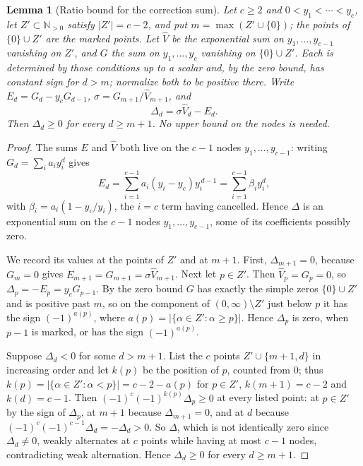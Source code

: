 \documentclass[11pt]{article}
\newtheorem{lemma}[theorem]{Lemma}
\newcommand{\N}{\mathbb N}
\begin{document}
\begin{lemma}[Ratio bound for the correction sum]\label{lem:interlace}
Let $c\ge2$ and $0<y_1<\cdots<y_c$, let $Z'\subset\N_{>0}$ satisfy $|Z'|=c-2$, and put
$m=\max(Z'\cup\{0\})$; the points of $\{0\}\cup Z'$ are the marked
points.  Let $\widehat V$ be the exponential sum on
$y_1,\ldots,y_{c-1}$ vanishing on $Z'$, and $G$ the sum on
$y_1,\ldots,y_c$ vanishing on $\{0\}\cup Z'$.  Each is determined by those
conditions up to a scalar and, by the zero bound, has constant sign for
$d>m$; normalize both to be positive there.  Write $E_d=G_d-y_cG_{d-1}$,
$\sigma=G_{m+1}/\widehat V_{m+1}$, and
\[
  \Delta_d=\sigma\widehat V_d-E_d.
\]
Then $\Delta_d\ge0$ for every $d\ge m+1$.  No upper bound on the nodes is
needed.
\end{lemma}

\begin{proof}
The sums $E$ and $\widehat V$ both live on the $c-1$ nodes
$y_1,\ldots,y_{c-1}$: writing $G_d=\sum_ia_iy_i^d$ gives
\[
  E_d=\sum_{i=1}^{c-1}a_i(y_i-y_c)y_i^{\,d-1}
      =\sum_{i=1}^{c-1}\beta_iy_i^d,
\]
with $\beta_i=a_i(1-y_c/y_i)$, the $i=c$ term having cancelled.  Hence $\Delta$
is an exponential sum on the $c-1$ nodes $y_1,\ldots,y_{c-1}$, some of its
coefficients possibly zero.

We record its values at the points of $Z'$ and at $m+1$.  First,
$\Delta_{m+1}=0$, because $G_m=0$ gives $E_{m+1}=G_{m+1}=\sigma\widehat
V_{m+1}$.  Next let $p\in Z'$.  Then $\widehat V_p=G_p=0$, so
$\Delta_p=-E_p=y_cG_{p-1}$.  By the zero bound $G$ has exactly the simple
zeros $\{0\}\cup Z'$ and is positive past $m$, so on the component of
$(0,\infty)\setminus Z'$ just below $p$ it has the sign $(-1)^{a(p)}$, where
$a(p)=|\{\alpha\in Z':\alpha\ge p\}|$.  Hence $\Delta_p$ is zero, when $p-1$
is marked, or has the sign $(-1)^{a(p)}$.

Suppose $\Delta_d<0$ for some $d>m+1$.  List the $c$ points
$Z'\cup\{m+1,d\}$ in increasing order and let $k(p)$ be the position of $p$,
counted from $0$; thus $k(p)=|\{\alpha\in Z':\alpha<p\}|=c-2-a(p)$ for
$p\in Z'$, $k(m+1)=c-2$ and $k(d)=c-1$.  Then
$(-1)^c(-1)^{k(p)}\Delta_p\ge0$ at every listed point: at $p\in Z'$ by the
sign of $\Delta_p$, at $m+1$ because $\Delta_{m+1}=0$, and at $d$ because
$(-1)^c(-1)^{c-1}\Delta_d=-\Delta_d>0$.  So $\Delta$, which is not
identically zero since $\Delta_d\ne0$, weakly alternates at $c$ points
while having at most $c-1$ nodes, contradicting weak alternation.  Hence
$\Delta_d\ge0$ for every $d\ge m+1$.
\end{proof}
\end{document}
